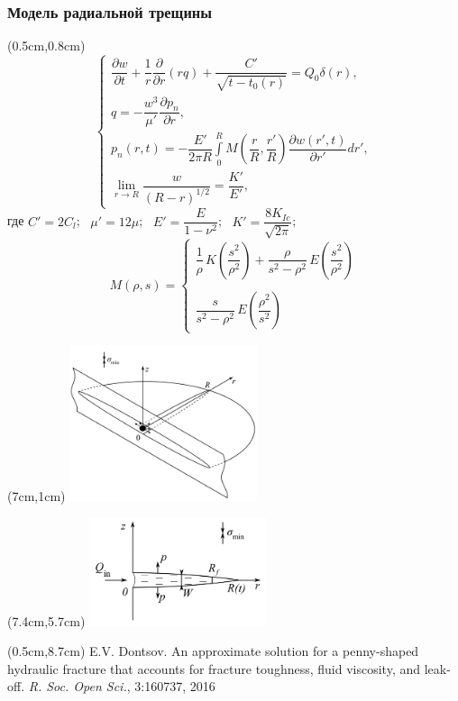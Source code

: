 \documentclass{beamer}
\begin{document}
\begin{frame}
\frametitle{Модель радиальной трещины}

\scriptsize

\begin{textblock*}{7cm}(0.5cm,0.8cm)
$$
\begin{cases}
\dfrac{\partial w}{\partial t}+\dfrac{1}{r}\dfrac{\partial}{\partial r}\!\left(rq\right)+\dfrac{C'}{\sqrt{t-t_0(r)}}=Q_0\delta(r),\\[15pt]
q=-\dfrac{w^3}{\mu'}\dfrac{\partial p_n}{\partial r},\\[5pt]
p_n(r,t)=-\dfrac{E'}{2\pi R}\displaystyle\int\limits_{0}^{R}M\!\left(\dfrac{r}{R},\dfrac{r'}{R}\right)\dfrac{\partial w(r',t)}{\partial r'}dr',\\[20pt]
\displaystyle\lim_{r\to R}\dfrac{w}{(R-r)^{1/2}}=\dfrac{K'}{E'},
\end{cases}
$$
где $C'=2C_l$; $\,\,\,\mu'=12\mu$; $\,\,\,E'=\dfrac{E}{1-\nu^2}$; $\,\,\,K'=\dfrac{8K_{Ic}}{\sqrt{2\pi}}$;
$$
M(\rho,s)=
\begin{cases}
\dfrac{1}{\rho}\,K\!\left(\dfrac{s^2}{\rho^2}\right)+\dfrac{\rho}{s^2-\rho^2}\,E\!\left(\dfrac{s^2}{\rho^2}\right)\\\ \\
\dfrac{s}{s^2-\rho^2}\,E\!\left(\dfrac{\rho^2}{s^2}\right)
\end{cases}
$$
\end{textblock*}

\begin{textblock*}{7cm}(7cm,1cm)
\includegraphics[width=5.5cm]{radial_model_3D.jpg}
\end{textblock*}

\begin{textblock*}{7cm}(7.4cm,5.7cm)
\includegraphics[width=5.2cm]{radial_model_A-A_plane.jpg}
\end{textblock*}

\begin{textblock*}{6cm}(0.5cm,8.7cm)
\tiny
\textcolor{lit_gray}{E.V. Dontsov. An approximate solution for a penny-shaped hydraulic fracture that accounts for fracture toughness, fluid viscosity, and leak-off. \emph{R. Soc. Open Sci.}, 3:160737, 2016}
\end{textblock*}

\normalsize

\end{frame}
\end{document}
